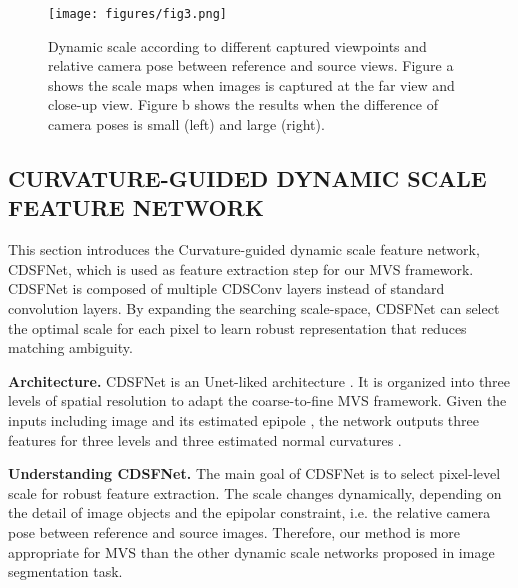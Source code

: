 \documentclass{article} \usepackage{iclr2022_conference,times}
\begin{document}
\begin{figure}[t]
\begin{center}
\texttt{[image: figures/fig3.png]}
\end{center}
\vspace{-0.25cm}
\caption{Dynamic scale according to different captured viewpoints and  relative camera pose between reference and source views. Figure a shows the scale maps when images is captured at the far view and close-up view. Figure b shows the results when the difference of camera poses is small (left) and large (right).}
\label{fig3}
\vspace{-0.5cm}
\end{figure}


\subsection{CURVATURE-GUIDED DYNAMIC SCALE FEATURE NETWORK}
\label{cdsfnet}
This section introduces the Curvature-guided dynamic scale feature network, CDSFNet, which is used as feature extraction step for our MVS framework. CDSFNet is composed of multiple CDSConv layers instead of standard convolution layers. By expanding the searching scale-space, CDSFNet can select the optimal scale for each pixel to learn robust representation that reduces matching ambiguity. 

\textbf{Architecture.} CDSFNet is an Unet-liked architecture \citep{ronneberger2015u}. It is organized into three levels of spatial resolution  to adapt the coarse-to-fine MVS framework. Given the inputs including image  and its estimated epipole , the network outputs three features for three levels  and three estimated normal curvatures . 

\textbf{Understanding CDSFNet.} The main goal of CDSFNet is to select pixel-level scale for robust feature extraction. The scale changes dynamically, depending on the detail of image objects and the epipolar constraint, i.e. the relative camera pose between reference and source images. Therefore, our method is more appropriate for MVS than the other dynamic scale networks \citep{he2019dynamic,wu2018dynamic,jia2016dynamic} proposed in image segmentation task.
\end{document}
